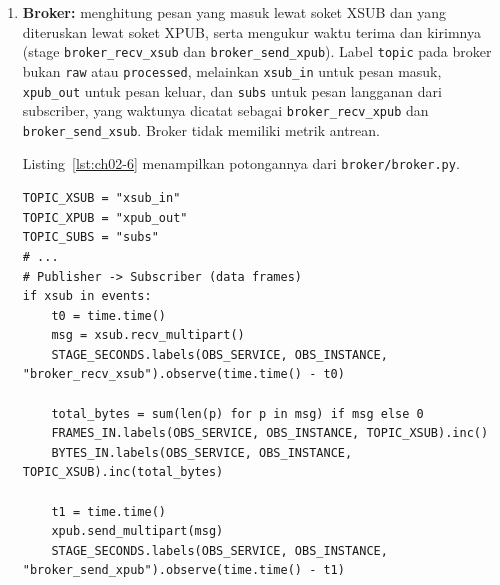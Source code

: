 \begin{enumerate}
\begin{enumerate}
Listing~\ref{lst:ch02-5} menampilkan potongannya dari \texttt{capturer/capturer.py}.
\begin{lstlisting}[style=PythonStyle, breakatwhitespace=true, caption={Potongan kode pada Tahapan Eksperimen (2)}, label={lst:ch02-5}]
t_enc = time.time()
ok2, jpg = cv2.imencode(".jpg", frame, encode_params)
STAGE_SECONDS.labels(
    OBS_SERVICE, OBS_INSTANCE, "capturer_encode_jpeg"
).observe(time.time() - t_enc)

if ok2:
    payload = jpg.tobytes()
    JPEG_BYTES.labels(OBS_SERVICE, OBS_INSTANCE, "out").observe(len(payload))
    # ...
    pub.send_multipart([TOPIC, json.dumps(header).encode("utf-8"), payload])

    FRAMES_OUT.labels(OBS_SERVICE, OBS_INSTANCE, topic_str).inc()
    BYTES_OUT.labels(OBS_SERVICE, OBS_INSTANCE, topic_str).inc(len(payload))
\end{lstlisting}

  \item \textbf{Broker:} menghitung pesan yang masuk lewat soket XSUB dan yang diteruskan lewat soket XPUB, serta mengukur waktu terima dan kirimnya (stage \texttt{broker\_recv\_xsub} dan \texttt{broker\_send\_xpub}). Label \texttt{topic} pada broker bukan \texttt{raw} atau \texttt{processed}, melainkan \texttt{xsub\_in} untuk pesan masuk, \texttt{xpub\_out} untuk pesan keluar, dan \texttt{subs} untuk pesan langganan dari subscriber, yang waktunya dicatat sebagai \texttt{broker\_recv\_xpub} dan \texttt{broker\_send\_xsub}. Broker tidak memiliki metrik antrean.

Listing~\ref{lst:ch02-6} menampilkan potongannya dari \texttt{broker/broker.py}.
\begin{lstlisting}[style=PythonStyle, breakatwhitespace=true, caption={Potongan kode pada Tahapan Eksperimen (3)}, label={lst:ch02-6}]
TOPIC_XSUB = "xsub_in"
TOPIC_XPUB = "xpub_out"
TOPIC_SUBS = "subs"
# ...
# Publisher -> Subscriber (data frames)
if xsub in events:
    t0 = time.time()
    msg = xsub.recv_multipart()
    STAGE_SECONDS.labels(OBS_SERVICE, OBS_INSTANCE, "broker_recv_xsub").observe(time.time() - t0)

    total_bytes = sum(len(p) for p in msg) if msg else 0
    FRAMES_IN.labels(OBS_SERVICE, OBS_INSTANCE, TOPIC_XSUB).inc()
    BYTES_IN.labels(OBS_SERVICE, OBS_INSTANCE, TOPIC_XSUB).inc(total_bytes)

    t1 = time.time()
    xpub.send_multipart(msg)
    STAGE_SECONDS.labels(OBS_SERVICE, OBS_INSTANCE, "broker_send_xpub").observe(time.time() - t1)


\end{lstlisting}
\end{enumerate}
\end{enumerate}
